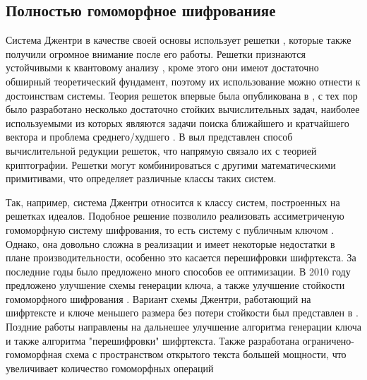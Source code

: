 \subsection{Полностью гомоморфное шифрованияе}

\color{Blue}
    Система Джентри в качестве своей основы использует решетки \cite{Jentry-09}, которые также получили огромное внимание после его работы. Решетки признаются устойчивыми к квантовому анализу \cite{Regev-06}, кроме этого они имеют достаточно обширный теоретический фундамент, поэтому их использование можно отнести к достоинствам системы. Теория решеток впервые была опубликована в \cite{Minkowski-68}, с тех пор было разработано несколько достаточно стойких вычислительных задач, наиболее используемыми из которых являются задачи поиска ближайшего  и кратчайшего вектора \cite{Peikert-15} и проблема среднего/худшего \cite{Atjai-96}. В \cite{Goldreich-97} выл представлен способ вычислительной редукции решеток, что напрямую связало их с теорией криптографии. Решетки могут комбинироваться с другими математическими примитивами, что определяет различные классы таких систем.\par

    \vspace{8mm}Так, например, система Джентри относится к классу систем, построенных на решетках идеалов. Подобное решение позволило реализовать ассиметриченую гомоморфную систему шифрования, то есть систему с публичным ключом \cite{Hoffstein-98}. Однако, она довольно сложна в реализации и имеет некоторые недостатки в плане производительности, особенно это касается перешифровки шифртекста. За последние годы было предложено много способов ее оптимизации. В 2010 году предложено улучшение схемы генерации ключа, а также улучшение стойкости гомоморфного шифрования \cite{Jentry-10}. Вариант схемы Джентри, работающий на шифртексте и ключе меньшего размера без потери стойкости был представлен в \cite{SmartVercauteren-10}. Поздние работы направлены на дальнешее улучшение алгоритма генерации ключа и также алгоритма "перешифровки" шифртекста. Также разработана ограничено-гомоморфная схема с пространством открытого текста большей мощности, что увеличивает количество гомоморфных операций \cite{Mikus-12}\par

